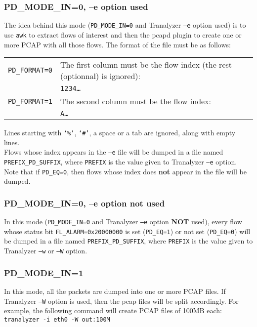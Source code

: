 \documentclass[documentation]{subfiles}
\begin{document}
\subsubsection{PD\_MODE\_IN=0, --e option used}\label{pcapdnormal}
The idea behind this mode ({\tt PD\_MODE\_IN=0} and Tranalyzer {\tt --e} option used) is to use {\tt awk} to extract flows of interest and then the pcapd plugin to create one or more PCAP with all those flows.
The format of the file must be as follows:
\begin{longtable}{ll}
    \toprule
    {\tt PD\_FORMAT=0} & The first column must be the flow index (the rest (optionnal) is ignored):\\
                       & {\tt 1234\qquad\ldots}\\
    {\tt PD\_FORMAT=1} & The second column must be the flow index:\\
                       & {\tt A\qquad1234\qquad\ldots}\\
    \bottomrule
\end{longtable}
Lines starting with {\tt`\%'}, {\tt`\#'}, a space or a tab are ignored, along with empty lines.\\

Flows whose index appears in the {\tt --e} file will be dumped in a file named {\tt PREFIX\_PD\_SUFFIX}, where {\tt PREFIX} is the value given to Tranalyzer {\tt --e} option.
Note that if {\tt PD\_EQ=0}, then flows whose index does {\bf not} appear in the file will be dumped.

\subsubsection{PD\_MODE\_IN=0, --e option not used}\label{pcapdalarm}
In this mode ({\tt PD\_MODE\_IN=0} and Tranalyzer {\tt --e} option {\bf NOT} used), every flow whose status bit {\tt FL\_ALARM=0x20000000} is set ({\tt PD\_EQ=1}) or not set ({\tt PD\_EQ=0}) will be dumped in a file named {\tt PREFIX\_PD\_SUFFIX}, where {\tt PREFIX} is the value given to Tranalyzer {\tt --w} or {\tt --W} option.

\subsubsection{PD\_MODE\_IN=1}\label{pcapdall}
In this mode, all the packets are dumped into one or more PCAP files. If Tranalyzer {\tt --W} option is used, then the pcap files will be split accordingly. For example, the following command will create PCAP files of 100MB each: {\tt tranalyzer -i eth0 -W out:100M}
\end{document}
